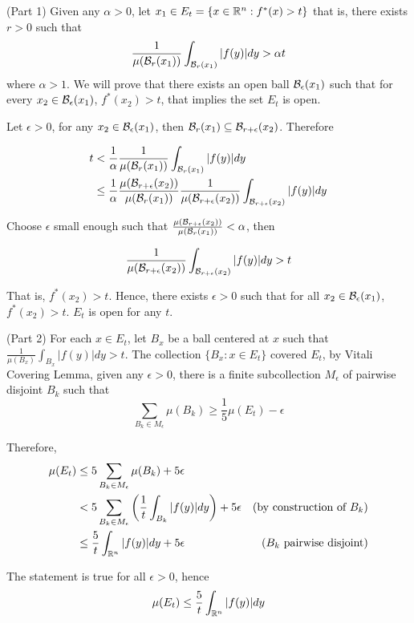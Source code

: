 \documentclass{report}
\begin{document}
(Part 1) Given any $\alpha > 0$, let $x_1 \in E_t = \{x \in \mathbb{R}^n: f^*(x) > t \}$ that is, there exists $r > 0$ such that 
\[
    \frac{1}{\mu(\mathcal{B}_r(x_1))} \int_{\mathcal{B}_r(x_1)} |f(y)|dy > \alpha t
\]
where $\alpha > 1$. We will prove that there exists an open ball $\mathcal{B}_\epsilon(x_1)$ such that for every $x_2 \in \mathcal{B}_\epsilon(x_1)$, $f^*(x_2) > t$, that implies the set $E_t$ is open.

Let $\epsilon > 0$, for any $x_2 \in \mathcal{B}_\epsilon(x_1)$, then $\mathcal{B}_r(x_1) \subseteq \mathcal{B}_{r + \epsilon}(x_2)$. Therefore

\begin{align*}
    t
    &< \frac{1}{\alpha} \frac{1}{\mu(\mathcal{B}_r(x_1))} \int_{\mathcal{B}_r(x_1)} |f(y)|dy \\
    &\leq \frac{1}{\alpha} \frac{\mu(\mathcal{B}_{r + \epsilon}(x_2))}{\mu(\mathcal{B}_r(x_1))} \frac{1}{\mu(\mathcal{B}_{r + \epsilon}(x_2))} \int_{\mathcal{B}_{r + \epsilon}(x_2)} |f(y)|dy
\end{align*}

Choose $\epsilon$ small enough such that $\frac{\mu(\mathcal{B}_{r + \epsilon}(x_2))}{\mu(\mathcal{B}_r(x_1))} < \alpha$, then 

\[
    \frac{1}{\mu(\mathcal{B}_{r + \epsilon}(x_2))} \int_{\mathcal{B}_{r + \epsilon}(x_2)} |f(y)|dy > t
\]

That is, $f^*(x_2) > t$. Hence, there exists $\epsilon > 0$ such that for all $x_2 \in \mathcal{B}_\epsilon(x_1)$, $f^*(x_2) > t$. $E_t$ is open for any $t$.

(Part 2) For each $x \in E_t$, let $B_x$ be a ball centered at $x$ such that $\frac{1}{\mu(B_x)} \int_{B_x} |f(y)|dy > t$. The collection $\{B_x: x \in E_t \}$ covered $E_t$, by Vitali Covering Lemma, given any $\epsilon > 0$, there is a finite subcollection $M_\epsilon$ of pairwise disjoint $B_k$ such that
\[
    \sum_{B_k \in M_\epsilon} \mu(B_k) \geq \frac{1}{5} \mu(E_t) - \epsilon
\]

Therefore,
\begin{align*}
    \mu(E_t)
    &\leq 5 \sum_{B_k \in M_\epsilon} \mu(B_k) + 5\epsilon \\
    &< 5 \sum_{B_k \in M_\epsilon} \left( \frac{1}{t} \int_{B_k} |f(y)|dy \right) + 5\epsilon &\text{(by construction of $B_k$)} \\
    &\leq \frac{5}{t} \int_{\mathbb{R}^n} |f(y)|dy + 5\epsilon &\text{($B_k$ pairwise disjoint)} \\
\end{align*}

The statement is true for all $\epsilon > 0$, hence
\[
    \mu(E_t) \leq \frac{5}{t} \int_{\mathbb{R}^n} |f(y)|dy
\]
\end{document}

